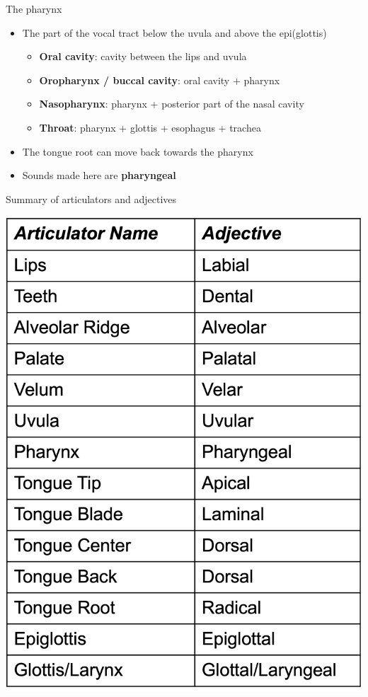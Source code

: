 \documentclass[professionalfonts]{beamer}
\begin{document}
\begin{frame}{The pharynx}
    \begin{itemize}
        \item The part of the vocal tract below the uvula and above the epi(glottis)
        \begin{itemize}
            \item \textbf{Oral cavity}: cavity between the lips and uvula
            \item \textbf{Oropharynx / buccal cavity}: oral cavity + pharynx
            \item \textbf{Nasopharynx}: pharynx + posterior part of the nasal cavity
            \item \textbf{Throat}: pharynx + glottis + esophagus + trachea
        \end{itemize}
        \item The tongue root can move back towards the pharynx
        \item Sounds made here are \textbf{pharyngeal}
    \end{itemize}
\end{frame}

\begin{frame}{Summary of articulators and adjectives}

    \begin{center}
        \includegraphics[width = 0.45\linewidth]{figs/Terminology.png}
    \end{center}

\end{frame}

\end{document}
